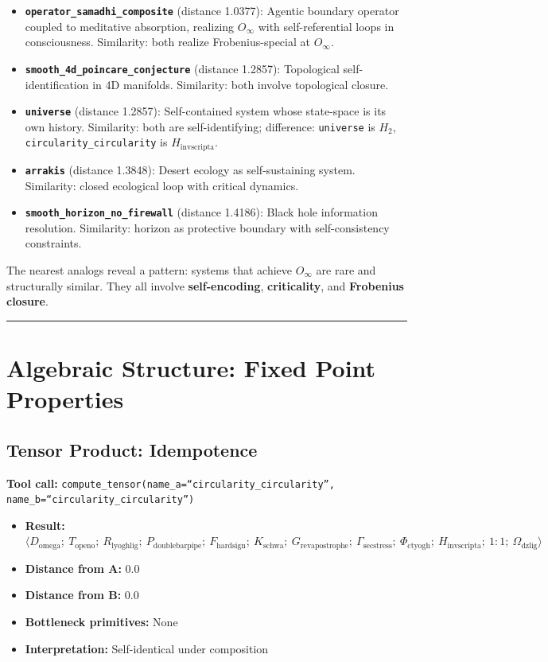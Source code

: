 \documentclass[12pt,a4paper]{article}
\begin{document}
\begin{itemize}
    \item \textbf{\texttt{operator\_samadhi\_composite}} (distance 1.0377): Agentic boundary operator coupled to meditative absorption, realizing $O_{\infty}$ with self-referential loops in consciousness. Similarity: both realize Frobenius-special at $O_{\infty}$.
    \item \textbf{\texttt{smooth\_4d\_poincare\_conjecture}} (distance 1.2857): Topological self-identification in 4D manifolds. Similarity: both involve topological closure.
    \item \textbf{\texttt{universe}} (distance 1.2857): Self-contained system whose state-space is its own history. Similarity: both are self-identifying; difference: \texttt{universe} is $H_2$, \texttt{circularity\_circularity} is $H_{\text{invscripta}}$.
    \item \textbf{\texttt{arrakis}} (distance 1.3848): Desert ecology as self-sustaining system. Similarity: closed ecological loop with critical dynamics.
    \item \textbf{\texttt{smooth\_horizon\_no\_firewall}} (distance 1.4186): Black hole information resolution. Similarity: horizon as protective boundary with self-consistency constraints.
\end{itemize}

The nearest analogs reveal a pattern: systems that achieve $O_{\infty}$ are rare and structurally similar. They all involve \textbf{self-encoding}, \textbf{criticality}, and \textbf{Frobenius closure}.

\begin{center}
\rule{0.5\textwidth}{0.4pt}
\end{center}

\section{Algebraic Structure: Fixed Point Properties}

\subsection{Tensor Product: Idempotence}

\textbf{Tool call:} \texttt{compute\_tensor(name\_a=\textquotedblleft circularity\_circularity\textquotedblright, name\_b=\textquotedblleft circularity\_circularity\textquotedblright)}

\begin{itemize}
    \item \textbf{Result:} $\langle D_{\text{omega}};\ T_{\text{openo}};\ R_{\text{lyoghlig}};\ P_{\text{doublebarpipe}};\ F_{\text{hardsign}};\ K_{\text{schwa}};\ G_{\text{revapostrophe}};\ \Gamma_{\text{secstress}};\ \Phi_{\text{ctyogh}};\ H_{\text{invscripta}};\ 1{:}1;\ \Omega_{\text{dzlig}} \rangle$
    \item \textbf{Distance from A:} 0.0
    \item \textbf{Distance from B:} 0.0
    \item \textbf{Bottleneck primitives:} None
    \item \textbf{Interpretation:} Self-identical under composition
\end{itemize}
\end{document}
